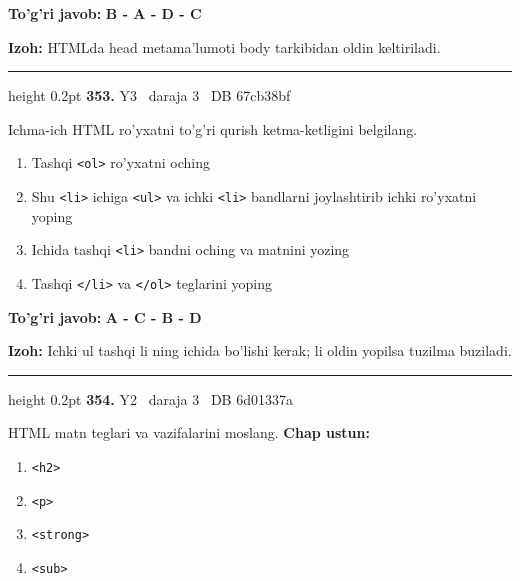 \documentclass[10pt,a4paper,oneside]{article}
\begin{document}
\begin{tcolorbox}[enhanced,breakable,colback=teal!4,colframe=teal!45!black,boxrule=0.45pt,arc=1.2mm,left=2.8mm,right=2.8mm,top=2mm,bottom=2mm,before skip=2mm,after skip=2mm]
\textbf{\color{teal}To'g'ri javob:} \textbf{B - A - D - C}
\par\smallskip
\textbf{Izoh:} HTMLda head metama'lumoti body tarkibidan oldin keltiriladi.
\end{tcolorbox}
\vspace{2mm}\hrule height 0.2pt \vspace{4mm}
\hypertarget{q353}{\textbf{\color{ink}353.}}  {\color{muted}\scriptsize Y3 \textbullet\ daraja 3 \textbullet\ DB 67cb38bf}
\par
Ichma-ich HTML ro'yxatni to'g'ri qurish ketma-ketligini belgilang.
\begin{enumerate}[label=\Alph*),leftmargin=9mm]
\item Tashqi \texttt{\textless{}ol\textgreater{}} ro'yxatni oching
\item Shu \texttt{\textless{}li\textgreater{}} ichiga \texttt{\textless{}ul\textgreater{}} va ichki \texttt{\textless{}li\textgreater{}} bandlarni joylashtirib ichki ro'yxatni yoping
\item Ichida tashqi \texttt{\textless{}li\textgreater{}} bandni oching va matnini yozing
\item Tashqi \texttt{\textless{}/li\textgreater{}} va \texttt{\textless{}/ol\textgreater{}} teglarini yoping
\end{enumerate}
\begin{tcolorbox}[enhanced,breakable,colback=teal!4,colframe=teal!45!black,boxrule=0.45pt,arc=1.2mm,left=2.8mm,right=2.8mm,top=2mm,bottom=2mm,before skip=2mm,after skip=2mm]
\textbf{\color{teal}To'g'ri javob:} \textbf{A - C - B - D}
\par\smallskip
\textbf{Izoh:} Ichki ul tashqi li ning ichida bo'lishi kerak; li oldin yopilsa tuzilma buziladi.
\end{tcolorbox}
\vspace{2mm}\hrule height 0.2pt \vspace{4mm}
\hypertarget{q354}{\textbf{\color{ink}354.}}  {\color{muted}\scriptsize Y2 \textbullet\ daraja 3 \textbullet\ DB 6d01337a}
\par
HTML matn teglari va vazifalarini moslang.
\textbf{\footnotesize Chap ustun:}
\begin{enumerate}[label=\arabic*),leftmargin=9mm]
\item \texttt{\textless{}h2\textgreater{}}
\item \texttt{\textless{}p\textgreater{}}
\item \texttt{\textless{}strong\textgreater{}}
\item \texttt{\textless{}sub\textgreater{}}
\end{enumerate}
\end{document}
